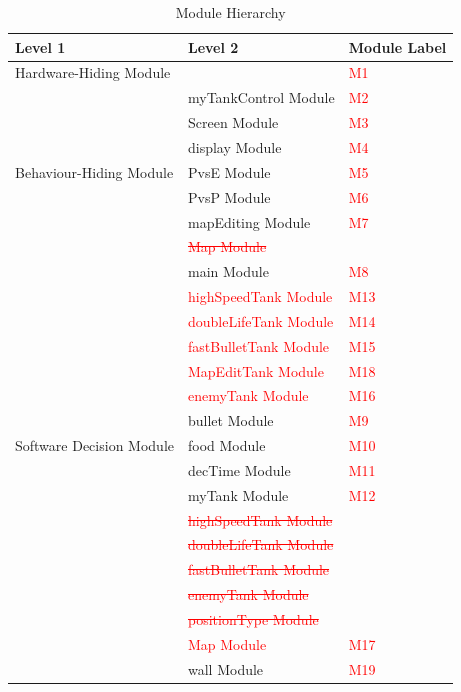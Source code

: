\documentclass[12pt, titlepage]{article}
\begin{document}
\begin{table}[h!]
\centering
\begin{tabular}{p{} p{} p{}}
\toprule
\textbf{Level 1} & \textbf{Level 2} & \textbf{Module Label}\\
\midrule

{Hardware-Hiding Module} & & \textcolor{red}{M1} \\
\midrule

\multirow{7}{0.3\textwidth}{Behaviour-Hiding Module} & myTankControl Module & \textcolor{red}{M2}\\
& Screen Module & \textcolor{red}{M3}\\
& display Module & \textcolor{red}{M4}\\
& PvsE Module & \textcolor{red}{M5}\\
& PvsP Module & \textcolor{red}{M6}\\
& mapEditing Module & \textcolor{red}{M7}\\
& \textcolor{red}{\sout{Map Module}}\\
& main Module & \textcolor{red}{M8}\\
& \textcolor{red}{highSpeedTank Module} & \textcolor{red}{M13}\\
& \textcolor{red}{doubleLifeTank Module} & \textcolor{red}{M14}\\
& \textcolor{red}{fastBulletTank Module} & \textcolor{red}{M15}\\
& \textcolor{red}{MapEditTank Module} & \textcolor{red}{M18}\\
& \textcolor{red}{enemyTank Module} & \textcolor{red}{M16}\\

\midrule

\multirow{3}{0.3\textwidth}{Software Decision Module} & bullet Module & \textcolor{red}{M9}\\
& food Module & \textcolor{red}{M10}\\
& decTime Module & \textcolor{red}{M11}\\
& myTank Module & \textcolor{red}{M12}\\
& \textcolor{red}{\sout{highSpeedTank Module}}\\
& \textcolor{red}{\sout{doubleLifeTank Module}}\\
& \textcolor{red}{\sout{fastBulletTank Module}}\\
& \textcolor{red}{\sout{enemyTank Module}}\\
& \textcolor{red}{\sout{positionType Module}}\\
& \textcolor{red}{Map Module} & \textcolor{red}{M17}\\
& wall Module & \textcolor{red}{M19}\\
\bottomrule

\end{tabular}
\caption{Module Hierarchy}
\label{TblMH}
\end{table}
\end{document}
